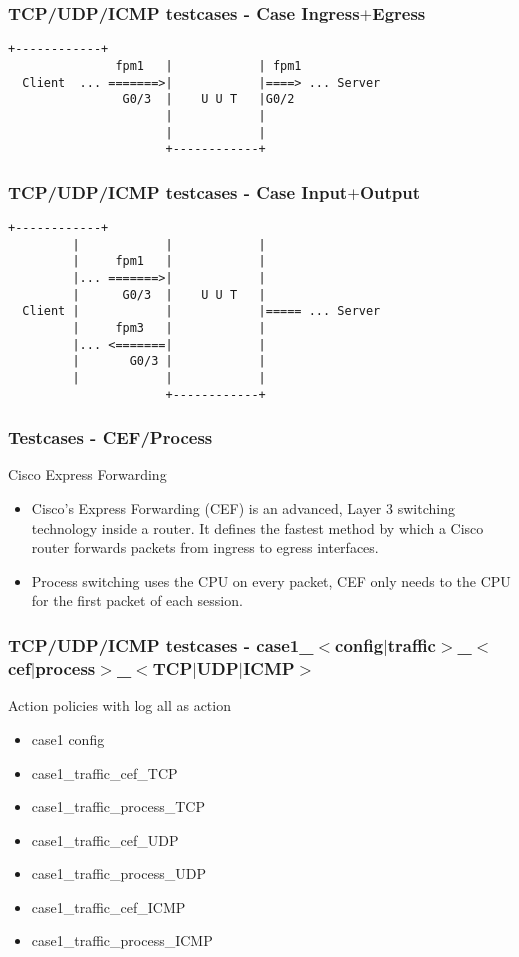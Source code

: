 \documentclass{beamer}
\begin{document}
\begin{frame}[fragile] \frametitle{TCP/UDP/ICMP testcases - Case Ingress$+$Egress}
\begin{lstlisting}[language=Terminall]
                      +------------+
               fpm1   |            | fpm1
  Client  ... =======>|            |====> ... Server
                G0/3  |    U U T   |G0/2
                      |            |
                      |            |
                      +------------+
\end{lstlisting}
\end{frame}

\begin{frame}[fragile] \frametitle{TCP/UDP/ICMP testcases - Case Input$+$Output}
\begin{lstlisting}[language=Terminall]
                      +------------+
         |            |            |
         |     fpm1   |            |
         |... =======>|            |
         |      G0/3  |    U U T   |
  Client |            |            |===== ... Server
         |     fpm3   |            |
         |... <=======|            |
         |       G0/3 |            |
         |            |            |
                      +------------+
\end{lstlisting}
\end{frame}

\begin{frame}[fragile] \frametitle{Testcases - CEF/Process}
    \begin{block}{Cisco Express Forwarding}
        \begin{itemize}
            \item Cisco's Express Forwarding (CEF) is an advanced, Layer 3 switching technology inside a router. It defines the fastest method by which a Cisco router forwards packets from ingress to egress interfaces.
            \item Process switching uses the CPU on every packet, CEF only needs to the CPU for the first packet of each session.
        \end{itemize}
    \end{block}
\end{frame}

\begin{frame}[fragile] \frametitle{TCP/UDP/ICMP testcases - case1\_$<$config$|$traffic$>$\_$<$cef$|$process$>$\_$<$TCP$|$UDP$|$ICMP$>$}
Action policies with log all as action
\begin{itemize}
    \item case1 config
	\item case1\_traffic\_cef\_TCP
	\item case1\_traffic\_process\_TCP
	\item case1\_traffic\_cef\_UDP
	\item case1\_traffic\_process\_UDP
	\item case1\_traffic\_cef\_ICMP
	\item case1\_traffic\_process\_ICMP
\end{itemize}
\end{frame}
\end{document}
